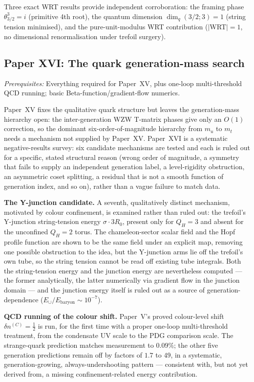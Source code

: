 \documentclass[11pt,a4paper]{article}
\begin{document}
Three exact WRT results provide independent corroboration:
the framing phase $\theta_{3/2}^3=i$ (primitive 4th root),
the quantum dimension $\dim_q(3/2;3)=1$ (string tension minimised),
and the pure-unit-modulus WRT contribution ($|$WRT$|=1$, no
dimensional renormalisation under trefoil surgery).

\subsection{Paper XVI: The quark generation-mass search}

\textit{Prerequisites:} Everything required for Paper~XV, plus one-loop
multi-threshold QCD running; basic Beta-function/gradient-flow numerics.

Paper~XV fixes the qualitative quark structure but leaves the
generation-mass hierarchy open: the inter-generation WZW T-matrix phases
give only an $O(1)$ correction, so the dominant six-order-of-magnitude
hierarchy from $m_u$ to $m_t$ needs a mechanism not supplied by Paper~XV.
Paper~XVI is a systematic negative-results survey: six candidate
mechanisms are tested and each is ruled out for a specific, stated
structural reason (wrong order of magnitude, a symmetry that fails to
supply an independent generation label, a level-rigidity obstruction,
an asymmetric coset splitting, a residual that is not a smooth function
of generation index, and so on), rather than a vague failure to match
data.

\textbf{The Y-junction candidate.} A seventh, qualitatively distinct
mechanism, motivated by colour confinement, is examined rather than
ruled out: the trefoil's Y-junction string-tension energy
$\sigma\cdot3R_0$, present only for $Q_H=3$ and absent for the
unconfined $Q_H=2$ torus. The chameleon-sector scalar field and the
Hopf profile function are shown to be the same field under an explicit
map, removing one possible obstruction to the idea, but the Y-junction
arms lie off the trefoil's own tube, so the string tension cannot be
read off existing tube integrals. Both the string-tension energy and
the junction energy are nevertheless computed --- the former
analytically, the latter numerically via gradient flow in the junction
domain --- and the junction energy itself is ruled out as a source of
generation-dependence ($E_\cup/E_{\mathrm{baryon}}\sim10^{-7}$).

\textbf{QCD running of the colour shift.} Paper~V's proved colour-level
shift $\delta n^{(C)}=\tfrac12$ is run, for the first time with a
proper one-loop multi-threshold treatment, from the condensate UV scale
to the PDG comparison scale. The strange-quark prediction matches
measurement to $0.09\%$; the other five generation predictions remain
off by factors of $1.7$ to $49$, in a systematic, generation-growing,
always-undershooting pattern --- consistent with, but not yet derived
from, a missing confinement-related energy contribution.
\end{document}
